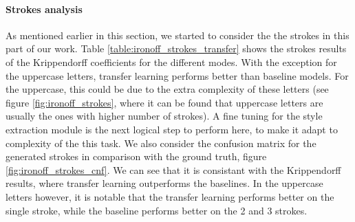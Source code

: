     \paragraph{Strokes analysis}
    As mentioned earlier in this section, we started to consider the the strokes in this part of our work. Table \ref{table:ironoff_strokes_transfer} shows the strokes results of the Krippendorff coefficients for the different modes. With the exception for the uppercase letters, transfer learning performs better than baseline models. For the uppercase, this could be due to the extra complexity of these letters (see figure \ref{fig:ironoff_strokes}, where it can be found that uppercase letters are usually the ones with higher number of strokes). A fine tuning for the style extraction module is the next logical step to perform here, to make it adapt to complexity of the this task. We also consider the confusion matrix for the generated strokes in comparison with the ground truth, figure \ref{fig:ironoff_strokes_cnf}. We can see that it is consistant with the Krippendorff results, where transfer learning outperforms the baselines. In the uppercase letters however, it is notable that the transfer learning performs better on the single stroke, while the baseline performs better on the 2 and 3 strokes.

